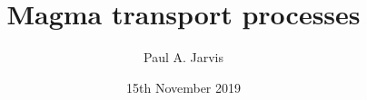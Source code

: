 \documentclass{beamer}
\title[Modeling volcanic processes]{Magma transport processes} %
\author[Paul Jarvis]{Paul A. Jarvis} %
\institute[UNIGE] %
{
\textit{paul.jarvis@unige.ch} %
}
\date{15th November 2019} %
\begin{document}
\begin{frame}
\titlepage %
\end{frame}





\end{document}
